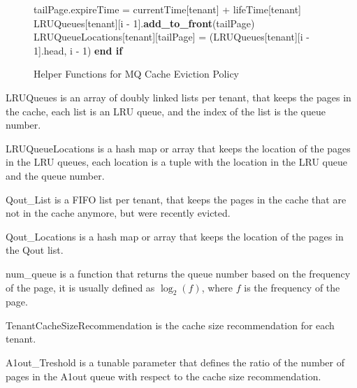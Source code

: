 \begin{figure}[htbp]
\begin{minipage}{\linewidth}
\begin{algorithm}[H]
\begin{algorithmic}
            \STATE \hspace{\algorithmicindent} \hspace{\algorithmicindent} \hspace{\algorithmicindent} tailPage.expireTime = currentTime[tenant] + lifeTime[tenant]
            \STATE \hspace{\algorithmicindent} \hspace{\algorithmicindent} \hspace{\algorithmicindent} LRUQueues[tenant][i - 1].\textbf{add\_to\_front}(tailPage)
            \STATE \hspace{\algorithmicindent} \hspace{\algorithmicindent} \hspace{\algorithmicindent} LRUQueueLocations[tenant][tailPage] = (LRUQueues[tenant][i - 1].head, i - 1)
            \STATE \hspace{\algorithmicindent} \hspace{\algorithmicindent} \textbf{end if}
        \end{algorithmic}
    \end{algorithm}
    \caption{Helper Functions for MQ Cache Eviction Policy}
    \label{fig:mq-helper}
    \end{minipage}
\end{figure}

\newpage

LRUQueues is an array of doubly linked lists per tenant, that keeps the pages in the cache,
each list is an LRU queue, and the index of the list is the queue number.

LRUQueueLocations is a hash map or array that keeps the location of the pages in the LRU queues,
each location is a tuple with the location in the LRU queue and the queue number.

Qout\_List is a FIFO list per tenant, that keeps the pages in the cache that are not in the cache
anymore, but were recently evicted.

Qout\_Locations is a hash map or array that keeps the location of the pages in the Qout list.

num\_queue is a function that returns the queue number based on the frequency of the page,
it is usually defined as $\log_2(f)$, where $f$ is the frequency of the page.

TenantCacheSizeRecommendation is the cache size recommendation for each tenant.

A1out\_Treshold is a tunable parameter that defines the ratio of the number of pages in the A1out
queue with respect to the cache size recommendation.

